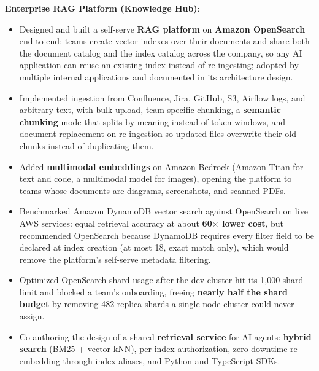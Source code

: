 \documentclass[letterpaper,9pt]{extarticle}
\newcommand{\resumeItem}[2]{
  \item\small{
    \textbf{#1}{:} 
  \begin{itemize}[label=\textbullet, leftmargin=8pt, itemsep=2pt]
      #2
    \end{itemize}
    }
}
\begin{document}
            \resumeItem{Enterprise RAG Platform (Knowledge Hub)}
            {
                \item Designed and built a self-serve \textbf{RAG platform} on \textbf{Amazon OpenSearch} end to end: teams create vector indexes over their documents and share both the document catalog and the index catalog across the company, so any AI application can reuse an existing index instead of re-ingesting; adopted by multiple internal applications and documented in its architecture design.

                \item Implemented ingestion from Confluence, Jira, GitHub, S3, Airflow logs, and arbitrary text, with bulk upload, team-specific chunking, a \textbf{semantic chunking} mode that splits by meaning instead of token windows, and document replacement on re-ingestion so updated files overwrite their old chunks instead of duplicating them.

                \item Added \textbf{multimodal embeddings} on Amazon Bedrock (Amazon Titan for text and code, a multimodal model for images), opening the platform to teams whose documents are diagrams, screenshots, and scanned PDFs.

                \item Benchmarked Amazon DynamoDB vector search against OpenSearch on live AWS services: equal retrieval accuracy at about \textbf{60$\times$ lower cost}, but recommended OpenSearch because DynamoDB requires every filter field to be declared at index creation (at most 18, exact match only), which would remove the platform's self-serve metadata filtering.

                \item Optimized OpenSearch shard usage after the dev cluster hit its 1,000-shard limit and blocked a team's onboarding, freeing \textbf{nearly half the shard budget} by removing 482 replica shards a single-node cluster could never assign.

                \item Co-authoring the design of a shared \textbf{retrieval service} for AI agents: \textbf{hybrid search} (BM25 + vector kNN), per-index authorization, zero-downtime re-embedding through index aliases, and Python and TypeScript SDKs.
            }
            \vspace{2pt}
\end{document}
